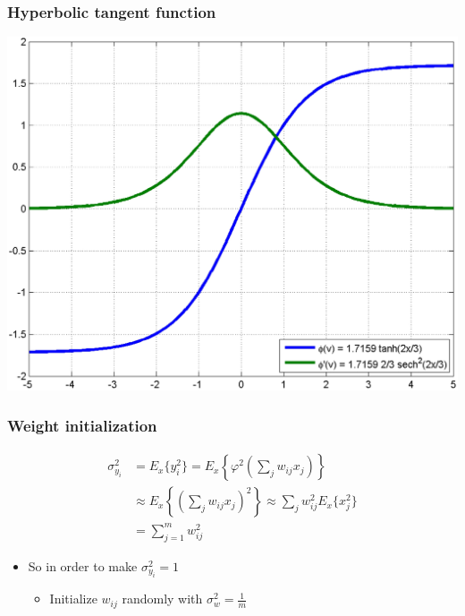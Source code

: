 \documentclass[12pt,notes,mathserif]{beamer}
\begin{document}
\begin{frame}[c]
	\frametitle{Hyperbolic tangent function}
	\begin{center}
		\includegraphics[width=0.7\linewidth]{fig/lec69.jpg}
	\end{center}
\end{frame}

\begin{frame}[c]
	\frametitle{Weight initialization}
	\[
		\begin{array}{rl}
			\sigma_{y_i}^2 & =E_x\{y_i^2\}=E_x\left\{\varphi^2\left(\sum\limits_jw_{ij}x_j\right)\right\} \\[5mm]
			               & \approx E_x \left\{\left(\sum\limits_jw_{ij}x_j\right)^2\right\}\approx
			\sum\limits_jw_{ij}^2E_x\{x_j^2\}                                                           \\
			               & =\sum\limits_{j=1}^mw_{ij}^2
		\end{array}
	\]
	\begin{itemize}
		\item So in order to make $\sigma_{y_i}^2=1$ 
		      \begin{itemize}
			      \item Initialize $w_{ij}$ randomly with $\sigma_w^2=\frac{1}{m}$
		      \end{itemize}
	\end{itemize}
\end{frame}
\end{document}
